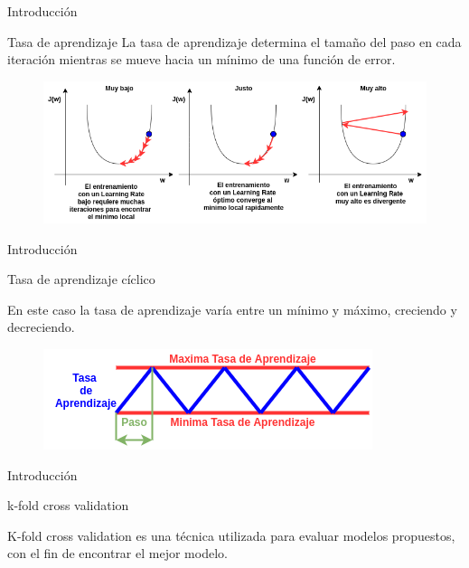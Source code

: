 \documentclass{beamer}
\begin{document}
\begin{frame}{Introducci\'on}

  \begin{block}{Tasa de aprendizaje}
    La tasa de aprendizaje determina el tama\~no del paso en cada iteraci\'on mientras se
    mueve hacia un m\'inimo de una funci\'on de error.
  \end{block}
  \begin{figure}
      \includegraphics[scale=0.45]{learning_rate}
  \end{figure}

\end{frame}



\begin{frame}{Introducci\'on}

  \begin{block}{Tasa de aprendizaje c\'iclico}

  En este caso la tasa de aprendizaje var\'ia entre un m\'inimo y m\'aximo, creciendo y decreciendo.

  \end{block}

  \begin{figure}
    \centering
    \includegraphics[width=0.8\textwidth%
    ]{cyclical_lr.png}
  \end{figure}

\end{frame}



\begin{frame}{Introducci\'on}


   \begin{block}{k-fold cross validation}

        K-fold cross validation es una t\'ecnica utilizada para evaluar modelos propuestos, con el fin de
        encontrar el mejor modelo.

    \end{block}

\end{frame}
\end{document}
